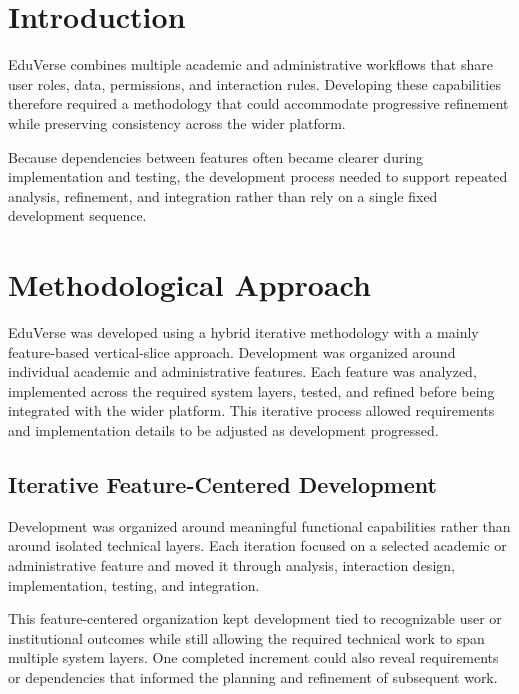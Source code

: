 
\section{Introduction}\label{sec:methodology_introduction}

EduVerse combines multiple academic and administrative workflows that share
user roles, data, permissions, and interaction rules. Developing these
capabilities therefore required a methodology that could accommodate
progressive refinement while preserving consistency across the wider platform.

Because dependencies between features often became clearer during
implementation and testing, the development process needed to support repeated
analysis, refinement, and integration rather than rely on a single fixed
development sequence.

\section{Methodological Approach}\label{sec:system_development_methodology}

EduVerse was developed using a hybrid iterative methodology with a mainly feature-based vertical-slice approach. Development was organized around individual academic and administrative features. Each feature was analyzed, implemented across the required system layers, tested, and refined before being integrated with the wider platform. This iterative process allowed requirements and implementation details to be adjusted as development progressed.

\subsection{Iterative Feature-Centered Development}\label{subsec:feature_based_iterative_workflow}

Development was organized around meaningful functional capabilities rather
than around isolated technical layers. Each iteration focused on a selected
academic or administrative feature and moved it through analysis, interaction
design, implementation, testing, and integration.

This feature-centered organization kept development tied to recognizable user
or institutional outcomes while still allowing the required technical work to
span multiple system layers. One completed increment could also reveal
requirements or dependencies that informed the planning and refinement of
subsequent work.


